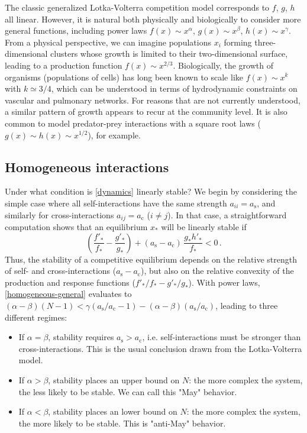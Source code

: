 \documentclass[%
 reprint,
 amsmath,amssymb,
 aps,
]{revtex4-2}
\begin{document}
The classic generalized Lotka-Volterra competition model corresponds to $f$, $g$, $h$ all linear. However, it is natural both physically and biologically to consider more general functions, including power laws $f(x)\sim x^\alpha$, $g(x)\sim x^\beta$, $h(x) \sim x^\gamma$. From a physical perspective, we can imagine populations $x_i$ forming three-dimensional clusters whose growth is limited to their two-dimensional surface, leading to a production function $f(x) \sim x^{2/3}$. Biologically, the growth of organisms (populations of cells) has long been known to scale like $f(x) \sim x^k$ with $k\simeq 3/4$, which can be understood in terms of hydrodynamic constraints on vascular and pulmonary networks. For reasons that are not currently understood, a similar pattern of growth appears to recur at the community level. It is also common to model predator-prey interactions with a square root laws ($g(x) \sim h(x) \sim x^{1/2}$), for example. 

\subsection{Homogeneous interactions}

Under what condition is \eqref{dynamics} linearly stable? We begin by considering the simple case where all self-interactions have the same strength $a_{ii} = a_{\textrm{s}}$, and similarly for cross-interactions $a_{ij} = a_{\textrm{c}}$ ($i\neq j$). In that case, a straightforward computation shows that an equilibrium $x_*$ will be linearly stable if  
\begin{equation}\label{homogeneous-general}
    \left(\frac{f'_*}{f_*} - \frac{g'_*}{g_*}\right) + (a_{\textrm{s}} - a_{\textrm{c}})\,\frac{g_*h'_*}{f_*} < 0 \, . 
\end{equation}
Thus, the stability of a competitive equilibrium depends on the relative strength of self- and cross-interactions ($a_{\textrm{s}} - a_{\textrm{c}}$), but also on the relative convexity of the production and response functions ($f'_*/f_* - g'_*/g_*$). With power laws, \eqref{homogeneous-general} evaluates to $(\alpha - \beta)(N-1) < \gamma(a_{\textrm{s}}/a_{\textrm{c}}- 1) - (\alpha - \beta)(a_{\textrm{s}}/a_{\textrm{c}})$, leading to three different regimes:
\begin{itemize}
    \item If $\alpha = \beta$, stability requires $a_{\textrm{s}} > a_{\textrm{c}}$, i.e. self-interactions must be stronger than cross-interactions. This is the usual conclusion drawn from the Lotka-Volterra model. 
    \item If $\alpha > \beta$, stability places an upper bound on $N$: the more complex the system, the less likely to be stable. We can call this "May" behavior.
    \item If $\alpha < \beta$, stability places an lower bound on $N$: the more complex the system, the more likely to be stable. This is "anti-May" behavior.
\end{itemize}
\end{document}
